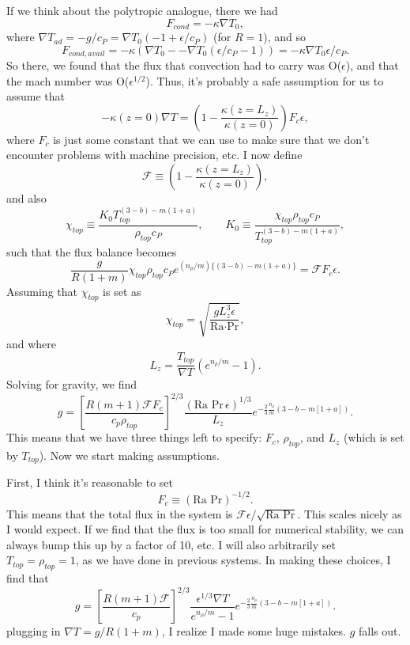 \documentclass[aps, pre, onecolumn, nofootinbib, notitlepage, groupedaddress, amsfonts, amssymb, amsmath, longbibliography]{revtex4-1}
\newcommand{\grad}{\ensuremath{\nabla}}
\begin{document}
If we think about the polytropic analogue, there we had
$$
F_{cond} = -\kappa\grad T_0,
$$
where $\grad T_{ad} = -g/c_P = \grad T_0(-1 + \epsilon/c_P)$ (for $R = 1$), and so
$$
F_{cond, avail} = -\kappa(\grad T_0 - -\grad T_0(\epsilon/c_P - 1))
= -\kappa \grad T_0 \epsilon / c_P.
$$
So there, we found that the flux that convection had to carry was O($\epsilon$),
and that the mach number was O($\epsilon^{1/2}$). Thus, it's probably a safe
assumption for us to assume that
\begin{equation}
-\kappa(z=0)\grad T = 
\left(1 - \frac{\kappa(z=L_z)}{\kappa(z=0)}\right)F_c \epsilon,
\end{equation}
where $F_c$ is just some constant that we can use to make sure that we don't
encounter problems with machine precision, etc. I now define
$$
\mathcal{F} \equiv \left(1 - \frac{\kappa(z=L_z)}{\kappa(z=0)}\right),
$$
and also
$$
\chi_{top} \equiv \frac{K_0 T_{top}^{(3-b) - m(1+a)}}{\rho_{top} c_P}, \qquad
K_0 \equiv \frac{\chi_{top}\rho_{top}c_P}{T_{top}^{(3-b)-m(1+a)}},
$$
such that the flux balance becomes
$$
\frac{g}{R(1+m)}\chi_{top}\rho_{top}c_P e^{(n_\rho/m)\{(3-b)-m(1+a)\}}
= \mathcal{F} F_c \epsilon.
$$
Assuming that $\chi_{top}$ is set as
\begin{equation}
\chi_{top} = \sqrt{\frac{g L_z^3 \epsilon}{\text{Ra}\cdot\text{Pr}}},
\end{equation}
and where
$$
L_z = \frac{T_{top}}{\grad T} (e^{n_\rho/m} - 1).
$$
Solving for gravity, we find
\begin{equation}
g = \left[\frac{R(m+1) \mathcal{F} F_c}{c_p \rho_{top}}\right]^{2/3}
\frac{(\text{Ra Pr}\, \epsilon)^{1/3}}{L_z} 
e^{-\frac{2}{3}\frac{n_\rho}{m}(3 - b - m[1+a])}.
\end{equation}
This means that we have three things left to specify: $F_c$, $\rho_{top}$,
and $L_z$ (which is set by $T_{top}$).  Now we start making assumptions.

First, I think it's reasonable to set
$$
F_c \equiv (\text{Ra Pr})^{-1/2}.
$$
This means that the total flux in the system is 
$\mathcal{F} \epsilon / \sqrt{\text{Ra Pr}}$. 
This scales nicely as I would expect. If we find that the flux is too
small for numerical stability, we can always bump this up by a factor of 10, etc.
I will also arbitrarily set $T_{top} = \rho_{top} = 1$, as we have done in previous
systems.  In making these choices, I find that
\begin{equation}
g = \left[\frac{R(m+1) \mathcal{F}}{c_p}\right]^{2/3}
\frac{\epsilon^{1/3}\grad T}{e^{n_\rho/m} - 1 }
e^{-\frac{2}{3}\frac{n_\rho}{m}(3 - b - m[1+a])}.
\end{equation}
plugging in $\grad T = g / R(1+m)$, I realize I made some huge mistakes. $g$ falls
out.




\end{document}
